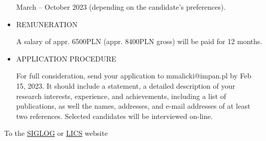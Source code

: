 \documentclass[prodmode,acmtecs]{acmsmall} %
\begin{document}
\begin{itemize}
  March – October 2023 (depending on the candidate’s preferences). 
 
\item  REMUNERATION 
 
  A salary of appr. 6500PLN (appr. 8400PLN gross) will be paid for 12 months. 
 
\item  APPLICATION PROCEDURE 
 
  For full consideration, send your application to mmalicki@impan.pl by Feb 15, 2023. It should include a statement, a detailed description of your research interests, experience, and achievements, including a list of publications, as well the names, addresses, and e-mail addresses of at least two references. Selected candidates will be interviewed on-line. 
 
\end{itemize}


To the \href{http://siglog.org/}{SIGLOG} or \href{https://lics.siglog.org}{LICS} website
\end{document}
